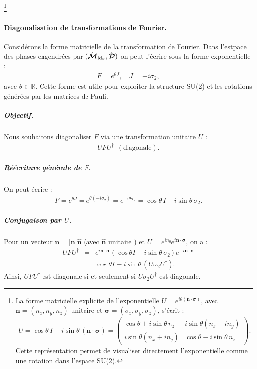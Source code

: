 \footnote{La forme matricielle explicite de l'exponentielle $U = e^{i \theta (\bm{n} \cdot \bm{\sigma})}$, avec $\bm{n} = (n_x, n_y, n_z)$ unitaire et $\bm{\sigma} = (\sigma_x, \sigma_y, \sigma_z)$, s'écrit :
\begin{eqnarray}
U = \cos \theta \, I + i \sin \theta \, (\bm{n} \cdot \bm{\sigma}) 
= \begin{pmatrix}
\cos \theta + i \sin \theta \, n_z & i \sin \theta (n_x - i n_y) \\
i \sin \theta (n_x + i n_y) & \cos \theta - i \sin \theta \, n_z
\end{pmatrix}.
\end{eqnarray}
Cette représentation permet de visualiser directement l'exponentielle comme une rotation dans l'espace SU(2).}


\paragraph{Diagonalisation de transformations de Fourier.}
Considérons la forme matricielle de la transformation de Fourier. Dans l'estpace des phases engendrées par $(\hat{\bm{\mathcal M}}_{\mathrm{id}_{\mathbb R}} , \hat{\bm{\mathcal D}} )$ on peut l'écrire sous la forme exponentielle :
\begin{eqnarray}
F = e^{\theta J}, \quad J = -i \sigma_2,
\end{eqnarray}
avec $\theta \in \mathbb{R}$. Cette forme est utile pour exploiter la structure SU(2) et les rotations générées par les matrices de Pauli.

\subparagraph{Objectif.} 
Nous souhaitons diagonaliser $F$ via une transformation unitaire $U$ :
\begin{eqnarray}
U F U^\dagger ~~(\text{diagonale}).
\end{eqnarray}


\subparagraph{Réécriture générale de $F$.}
On peut écrire :
\begin{eqnarray}
F = e^{\theta J} = e^{\theta (-i \sigma_2)} = e^{- i \theta \sigma_2} 
= \cos \theta \, I - i \sin \theta \, \sigma_2.
\end{eqnarray}

\subparagraph{Conjugaison par $U$.}
Pour un vecteur $\bm{n} = |\bm{n}| \hat{\bm{n}}$ (avec $\hat{\bm{n}}$ unitaire  )  et $U = e^{i n_0}e^{i \bm{n} \cdot \bm{\sigma}}$, on a :
\begin{eqnarray}
U F U^\dagger &=& e^{i \bm{n} \cdot \bm{\sigma}} (\cos \theta I - i \sin \theta \, \sigma_2) e^{- i \bm{n} \cdot \bm{\sigma}} \\
&=& \cos \theta I - i \sin \theta \, (U \sigma_2 U^\dagger).
\end{eqnarray}
Ainsi, $U F U^\dagger$ est diagonale si et seulement si $U \sigma_2 U^\dagger$ est diagonale.

